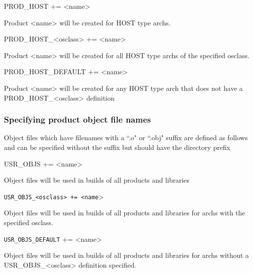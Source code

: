 \begin{description}\item {}PROD\_HOST += \textless{}name\textgreater{}

\end{description}Product \textless{}name\textgreater{} will be created for HOST type archs.

\begin{description}\item PROD\_HOST\_\textless{}osclass\textgreater{} += \textless{}name\textgreater{}

\end{description}Product \textless{}name\textgreater{} will be created for all HOST type archs of the specified osclass.

\begin{description}\item PROD\_HOST\_DEFAULT += \textless{}name\textgreater{}

\end{description}Product \textless{}name\textgreater{} will be created for any HOST type arch that does not have a PROD\_HOST\_\textless{}osclass\textgreater{} 
definition

\subsubsection{Specifying product object file names}

Object files which have filenames with a ``.o" or ``.obj" suffix are defined as follows and can be specified without the 
suffix but should have the directory prefix 

\begin{description}\item {}USR\_OBJS += \textless{}name\textgreater{}

\end{description}Object files will be used in builds of all products and libraries

\begin{description}\item \verb|USR_OBJS_<osclass> += <name|\textgreater{}

\end{description}Object files will be used in builds of all products and libraries for archs with the specified osclass.

\begin{description}\item \verb|USR_OBJS_DEFAULT| += \textless{}name\textgreater{}

\end{description}Object files will be used in builds of all products and libraries for archs without a USR\_OBJS\_\textless{}osclass\textgreater{} 
definition specified.


